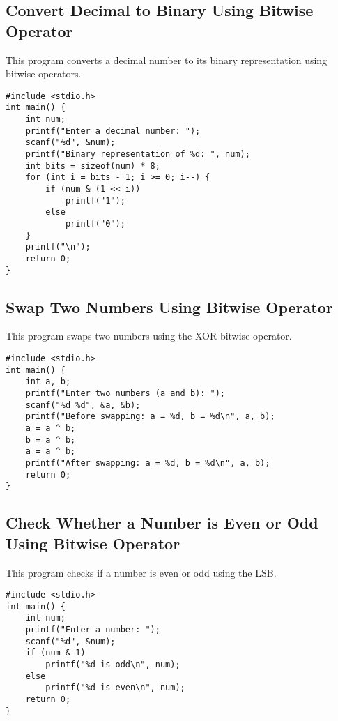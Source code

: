 \documentclass[a4paper,12pt]{article}
\begin{document}
\newpage

\subsection{Convert Decimal to Binary Using Bitwise Operator}
This program converts a decimal number to its binary representation using bitwise operators.

\begin{lstlisting}[caption={Convert Decimal to Binary Using Bitwise Operator}]
#include <stdio.h>
int main() {
    int num;
    printf("Enter a decimal number: ");
    scanf("%d", &num);
    printf("Binary representation of %d: ", num);
    int bits = sizeof(num) * 8;
    for (int i = bits - 1; i >= 0; i--) {
        if (num & (1 << i))
            printf("1");
        else
            printf("0");
    }
    printf("\n");
    return 0;
}
\end{lstlisting}

\newpage

\subsection{Swap Two Numbers Using Bitwise Operator}
This program swaps two numbers using the XOR bitwise operator.

\begin{lstlisting}[caption={Swap Two Numbers Using Bitwise Operator}]
#include <stdio.h>
int main() {
    int a, b;
    printf("Enter two numbers (a and b): ");
    scanf("%d %d", &a, &b);
    printf("Before swapping: a = %d, b = %d\n", a, b);
    a = a ^ b;
    b = a ^ b;
    a = a ^ b;
    printf("After swapping: a = %d, b = %d\n", a, b);
    return 0;
}
\end{lstlisting}

\newpage

\subsection{Check Whether a Number is Even or Odd Using Bitwise Operator}
This program checks if a number is even or odd using the LSB.

\begin{lstlisting}[caption={Check Whether a Number is Even or Odd Using Bitwise Operator}]
#include <stdio.h>
int main() {
    int num;
    printf("Enter a number: ");
    scanf("%d", &num);
    if (num & 1)
        printf("%d is odd\n", num);
    else
        printf("%d is even\n", num);
    return 0;
}
\end{lstlisting}
\end{document}
